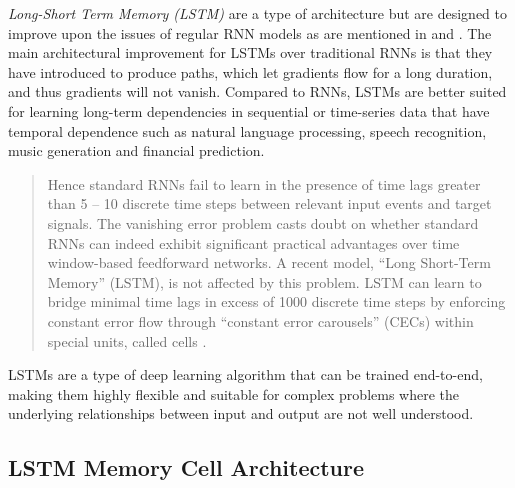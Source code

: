         \emph{Long-Short Term Memory (LSTM)} \cite{hochreiterLongShortTermMemory1997} \cite{gravesLongShorttermMemory2012} are a type of  architecture but are designed to improve upon the issues of regular RNN models as are mentioned in  and . 
        The main architectural improvement for LSTMs over traditional RNNs is that they have introduced  to produce paths, which let gradients flow for a long duration, and thus gradients will not vanish.
        Compared to RNNs, LSTMs are better suited for learning long-term dependencies in sequential or time-series data that have temporal dependence such as natural language processing, speech recognition, music generation and financial prediction.
        \begin{quote}
            Hence standard RNNs fail to learn in the presence of time lags greater than 5 – 10 discrete time steps between relevant input events and target signals. The vanishing error problem casts doubt on whether standard RNNs can indeed exhibit significant practical advantages over time window-based feedforward networks. A recent model, “Long Short-Term Memory” (LSTM), is not affected by this problem. LSTM can learn to bridge minimal time lags in excess of 1000 discrete time steps by enforcing constant error flow through “constant error carousels” (CECs) within special units, called cells \cite{gersLearningForgetContinual2000}.
        \end{quote}
        LSTMs are a type of deep learning algorithm that can be trained end-to-end, making them highly flexible and suitable for complex problems where the underlying relationships between input and output are not well understood.



        \subsection{LSTM Memory Cell Architecture}
        \label{sec:lstm-memory-cell-architecture-background}

